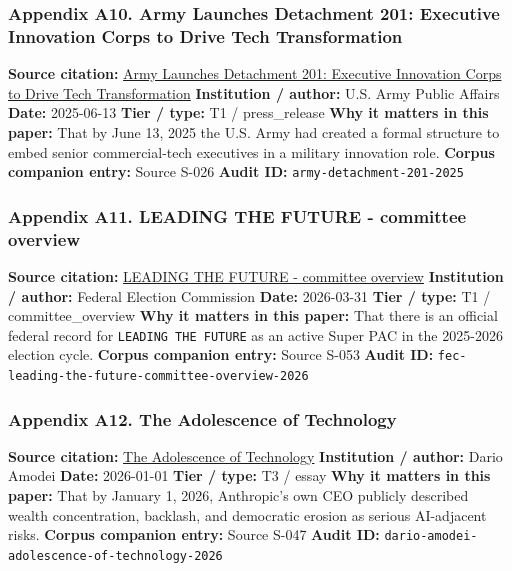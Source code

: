 \documentclass[
  american,
  11pt,
  letterpaper,
]{article}
\begin{document}
\subsubsection{Appendix A10. Army Launches Detachment 201: Executive
Innovation Corps to Drive Tech
Transformation}\label{ch-08-appendix-a10-army-launches-detachment-201-executive-innovation-corps-to-drive-tech-transformation}

\textbf{Source citation:}
\href{https://www.army.mil/article/286317/army_launches_detachment_201_executive_innovation_corps_to_drive_tech_transformation}{Army
Launches Detachment 201: Executive Innovation Corps to Drive Tech
Transformation} \textbf{Institution / author:} U.S. Army Public Affairs
\textbf{Date:} 2025-06-13 \textbf{Tier / type:} T1 / press\_release
\textbf{Why it matters in this paper:} That by June 13, 2025 the U.S.
Army had created a formal structure to embed senior commercial-tech
executives in a military innovation role. \textbf{Corpus companion
entry:} Source S-026 \textbf{Audit ID:}
\texttt{army-detachment-201-2025}

\subsubsection{Appendix A11. LEADING THE FUTURE - committee
overview}\label{ch-08-appendix-a11-leading-the-future-committee-overview}

\textbf{Source citation:}
\href{https://www.fec.gov/data/committee/C00916114/}{LEADING THE FUTURE
- committee overview} \textbf{Institution / author:} Federal Election
Commission \textbf{Date:} 2026-03-31 \textbf{Tier / type:} T1 /
committee\_overview \textbf{Why it matters in this paper:} That there is
an official federal record for \texttt{LEADING\ THE\ FUTURE} as an
active Super PAC in the 2025-2026 election cycle. \textbf{Corpus
companion entry:} Source S-053 \textbf{Audit ID:}
\texttt{fec-leading-the-future-committee-overview-2026}

\subsubsection{Appendix A12. The Adolescence of
Technology}\label{ch-08-appendix-a12-the-adolescence-of-technology}

\textbf{Source citation:}
\href{https://darioamodei.com/essay/the-adolescence-of-technology}{The
Adolescence of Technology} \textbf{Institution / author:} Dario Amodei
\textbf{Date:} 2026-01-01 \textbf{Tier / type:} T3 / essay \textbf{Why
it matters in this paper:} That by January 1, 2026, Anthropic's own CEO
publicly described wealth concentration, backlash, and democratic
erosion as serious AI-adjacent risks. \textbf{Corpus companion entry:}
Source S-047 \textbf{Audit ID:}
\texttt{dario-amodei-adolescence-of-technology-2026}
\end{document}
